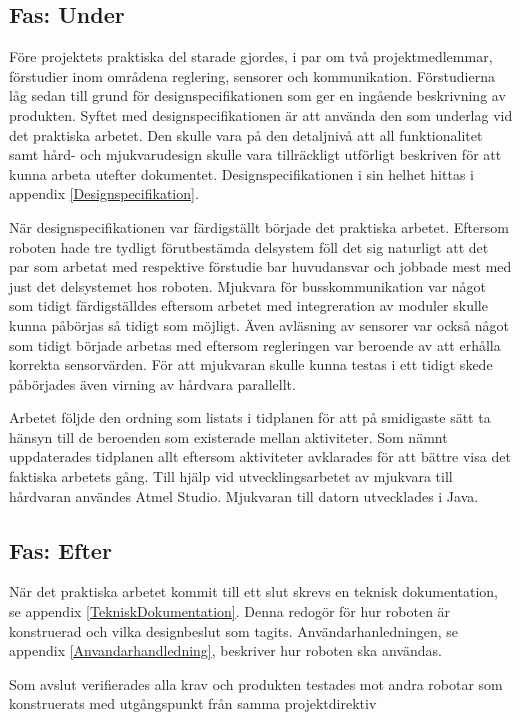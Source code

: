 \documentclass[11pt]{article}
\begin{document}
\begin{flushleft}
\subsection{Fas: Under}
Före projektets praktiska del starade gjordes, i par om två projektmedlemmar, förstudier inom områdena reglering, sensorer och kommunikation. Förstudierna låg sedan till grund för designspecifikationen som ger en ingående beskrivning av produkten. Syftet med designspecifikationen är att använda den som underlag vid det praktiska arbetet. Den skulle vara på den detaljnivå att all funktionalitet samt hård- och mjukvarudesign skulle vara tillräckligt utförligt beskriven för att kunna arbeta utefter dokumentet. Designspecifikationen i sin helhet hittas i appendix \ref{Designspecifikation}. 

När designspecifikationen var färdigställt började det praktiska arbetet. Eftersom roboten hade tre tydligt förutbestämda delsystem föll det sig naturligt att det par som arbetat med respektive förstudie bar huvudansvar och jobbade mest med just det delsystemet hos roboten. Mjukvara för busskommunikation var något som tidigt färdigställdes eftersom arbetet med integreration av moduler skulle kunna påbörjas så tidigt som möjligt. Även avläsning av sensorer var också något som tidigt började arbetas med eftersom regleringen var beroende av att erhålla korrekta sensorvärden. För att mjukvaran skulle kunna testas i ett tidigt skede påbörjades även virning av hårdvara parallellt. 

Arbetet följde den ordning som listats i tidplanen för att på smidigaste sätt ta hänsyn till de beroenden som existerade mellan aktiviteter. Som nämnt uppdaterades tidplanen allt eftersom aktiviteter avklarades för att bättre visa det faktiska arbetets gång. Till hjälp vid utvecklingsarbetet av mjukvara till hårdvaran användes Atmel Studio. Mjukvaran till datorn utvecklades i Java. 

\subsection{Fas: Efter}
När det praktiska arbetet kommit till ett slut skrevs en teknisk dokumentation, se appendix \ref{TekniskDokumentation}. Denna redogör för hur roboten är konstruerad och vilka designbeslut som tagits. Användarhanledningen, se appendix \ref{Anvandarhandledning}, beskriver hur roboten ska användas.

Som avslut verifierades alla krav och produkten testades mot andra robotar som konstruerats med utgångspunkt från samma projektdirektiv


\end{flushleft}
\end{document}

